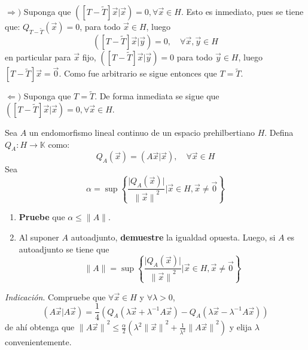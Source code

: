 \documentclass[12pt]{report}
\newcounter{it}
\theoremstyle{largebreak}
\newcommand\abs[1]{\ensuremath{\big|#1\big|}}
\newcommand\cf[3]{\ensuremath{#1:#2\rightarrow#3}}
\newcommand\adj[1]{\ensuremath{\widetilde{#1}}}
\newcommand\pint[2]{\ensuremath{\left(#1\big|#2\right)}}
\newcommand\norm[1]{\ensuremath{\|#1\|}}
\begin{document}
\begin{sol}
        $\Rightarrow)$ Suponga que $\pint{\left[T-\adj{T}\right]\vec{x}}{\vec{x}}=0,\forall\vec{x}\in H$. Esto es inmediato, pues se tiene que: $Q_{T-\adj{T}}(\vec{x})=0$, para todo $\vec{x}\in H$, luego
        \begin{equation*}
            \pint{\left[T-\adj{T}\right]\vec{x}}{\vec{y}}=0,\quad\forall\vec{x},\vec{y}\in H
        \end{equation*}
        en particular para $\vec{x}$ fijo, $\pint{\left[T-\adj{T}\right]\vec{x}}{\vec{y}}=0$ para todo $\vec{y}\in H$, luego $\left[T-\adj{T}\right]\vec{x}=\vec{0}$. Como fue arbitrario se sigue entonces que $T=\adj{T}$.

        $\Leftarrow)$ Suponga que $T=\adj{T}$. De forma inmediata se sigue que $\pint{\left[T-\adj{T}\right]\vec{x}}{\vec{x}}=0,\forall\vec{x}\in H$.

    \end{sol}

    \begin{excer}
        Sea $A$ un endomorfismo lineal continuo de un espacio prehilbertiano $H$. Defina $\cf{Q_A}{H}{\mathbb{K}}$ como:
        \begin{equation*}
            Q_A(\vec{x})=\pint{A\vec{x}}{\vec{x}},\quad\forall\vec{x}\in H
        \end{equation*}
        Sea
        \begin{equation*}
            \alpha=\sup\left\{\frac{\abs{Q_A(\vec{x})}}{\norm{\vec{x}}^2}\big| \vec{x}\in H,\vec{x}\neq\vec{0} \right\}
        \end{equation*}
        \begin{enumerate}
            \item \textbf{Pruebe} que $\alpha\leq\norm{A}$.
            \item Al suponer $A$ autoadjunto, \textbf{demuestre} la igualdad opuesta. Luego, si $A$ es autoadjunto se tiene que
            \begin{equation*}
                \norm{A}=\sup\left\{\frac{\abs{Q_A(\vec{x})}}{\norm{\vec{x}}^2}\big| \vec{x}\in H,\vec{x}\neq\vec{0} \right\}
            \end{equation*}
        \end{enumerate}
        \textit{Indicación}. Compruebe que $\forall\vec{x}\in H$ y $\forall\lambda>0$,
        \begin{equation*}
            \pint{A\vec{x}}{A\vec{x}}=\frac{1}{4}\left(Q_A(\lambda\vec{x}+\lambda^{-1}A\vec{x})-Q_A(\lambda\vec{x}-\lambda^{-1}A\vec{x})\right)
        \end{equation*}
        de ahí obtenga que $\norm{A\vec{x}}^2\leq\frac{\alpha}{2}\left(\lambda^2\norm{\vec{x}}^2+\frac{1}{\lambda^2}\norm{A\vec{x}}^2 \right)$ y elija $\lambda$ convenientemente.
    \end{excer}
\end{document}
